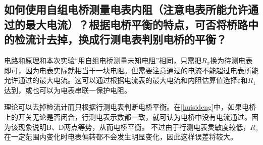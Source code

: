 \documentclass[]{../template/Report}%
\begin{document}
\begin{fullreportonly}
\subsection{如何使用自组电桥测量电表内阻（注意电表所能允许通过的最大电流）？根据电桥平衡的特点，可否将桥路中的检流计去掉，换成行测电表判别电桥的平衡？}

电路和原理和本次实验“用自组电桥测量未知电阻”相同，只需把$R_x$换为待测电表即可，因为电表实际就相当于一块电阻。但需要注意通过的电流不能超过电表所能允许通过的最大电流。这可以通过根据电流表的最大电流和内阻估算值选择$\varepsilon$和$R_1$达到，或也可以为电表串联一保护电阻。

理论可以去掉检流计而只根据行测电表判断电桥平衡。在\cref{huisideng}中，如果电桥上的开关无论是否闭合，行测电表示数都一致，就可认为电桥中没有电流通过。因为该现象说明B、D两点等势，从而电桥平衡。
不过由于行测电表灵敏度较低，$R_s$在一定范围内变化时电表偏转都不会发生明显变化，因此这样误差将较大。

\end{fullreportonly}
\insertnotes
\end{document}
